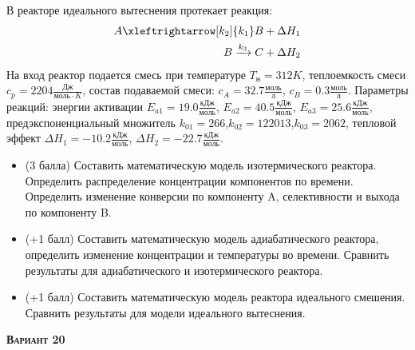  В реакторе идеального вытеснения протекает реакция: \begin{equation*} \begin{aligned} A \xleftrightarrow[k_2]{k_1} B + \Delta H_1 \\ B \xrightarrow{k_3} C + \Delta H_2 \end{aligned} \end{equation*}                                      На вход  реактор подается смесь при температуре $ T_н =  312 K$, теплоемкость смеси $c_p= 2204 \frac{Дж}{моль \cdot K}$, состав подаваемой смеси: $c_A=32.7 \frac{моль}{л}$, $c_B=0.3 \frac{моль}{л}$. Параметры реакций: энергии активации $E_{a1}=19.0 \frac{кДж}{моль}$, $E_{a2}=40.5  \frac{кДж}{моль}$, $E_{a3}=25.6  \frac{кДж}{моль}$, предэкспоненциальный множитель $k_{01}=       266$,$k_{02}=    122013$,$k_{03}=      2062$, тепловой эффект $\Delta H_1= -10.2  \frac{кДж}{моль}$, $\Delta H_2=-22.7 \frac{кДж}{моль}$.\begin{itemize} \item (3 балла) Составить математическую модель изотермического реактора. Определить распределение концентрации компонентов по времени. Определить изменение конверсии по компоненту A, селективности и выхода по компоненту B. \item (+1 балл) Составить математическую модель адиабатического реактора, определить изменение концентрации и температуры во времени. Сравнить результаты для адиабатического и изотермического реактора. \item (+1 балл) Составить математическую модель реактора идеального смешения. Сравнить результаты для модели идеального вытеснения. \end{itemize}

\textsc{\textbf{Вариант 20}}

